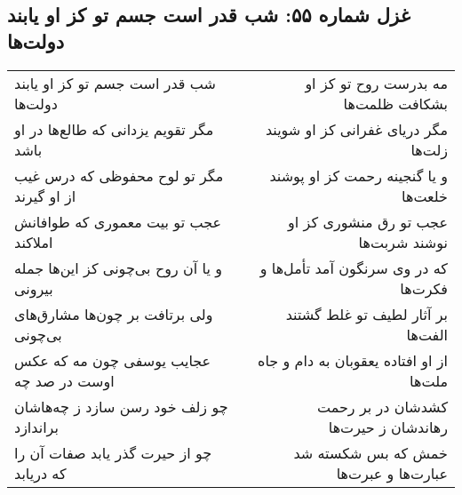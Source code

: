 \begin{center}
\section*{غزل شماره ۵۵: شب قدر است جسم تو کز او یابند دولت‌ها}
\label{sec:0055}
\begin{longtable}{l p{0.5cm} r}
شب قدر است جسم تو کز او یابند دولت‌ها
&&
مه بدرست روح تو کز او بشکافت ظلمت‌ها
\\
مگر تقویم یزدانی که طالع‌ها در او باشد
&&
مگر دریای غفرانی کز او شویند زلت‌ها
\\
مگر تو لوح محفوظی که درس غیب از او گیرند
&&
و یا گنجینه رحمت کز او پوشند خلعت‌ها
\\
عجب تو بیت معموری که طوافانش املاکند
&&
عجب تو رق منشوری کز او نوشند شربت‌ها
\\
و یا آن روح بی‌چونی کز این‌ها جمله بیرونی
&&
که در وی سرنگون آمد تأمل‌ها و فکرت‌ها
\\
ولی برتافت بر چون‌ها مشارق‌های بی‌چونی
&&
بر آثار لطیف تو غلط گشتند الفت‌ها
\\
عجایب یوسفی چون مه که عکس اوست در صد چه
&&
از او افتاده یعقوبان به دام و جاه ملت‌ها
\\
چو زلف خود رسن سازد ز چه‌هاشان براندازد
&&
کشدشان در بر رحمت رهاندشان ز حیرت‌ها
\\
چو از حیرت گذر یابد صفات آن را که دریابد
&&
خمش که بس شکسته شد عبارت‌ها و عبرت‌ها
\\
\end{longtable}
\end{center}
